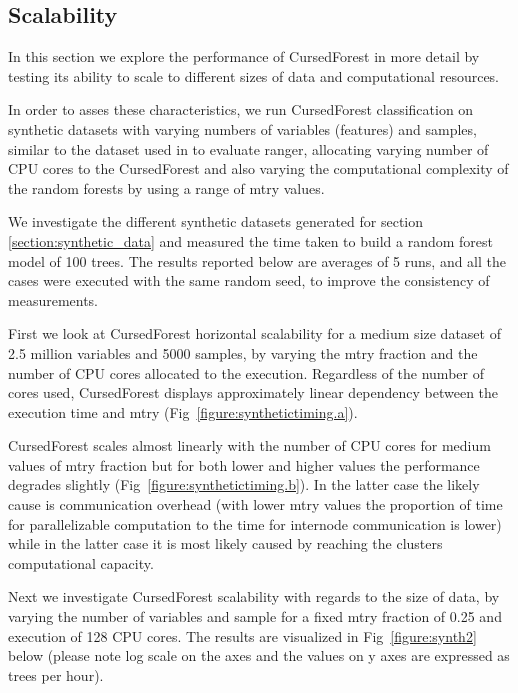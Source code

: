 \documentclass[a4paper]{amsart}
\begin{document}
\subsection{Scalability}
In this section we explore the performance of CursedForest in more detail by testing its ability to scale to different sizes of data
and computational resources.

In order to asses these characteristics, we run CursedForest classification on synthetic datasets with varying numbers
of variables (features) and samples, similar to the dataset used in \cite{Wright.and.Ziegle.2016} to evaluate
ranger, allocating varying number of CPU cores to the CursedForest and also varying the computational complexity
of the random forests by using a range of mtry values.

We investigate the different synthetic datasets generated for section \ref{section:synthetic_data} and measured the time
taken to build a random forest model of 100 trees. The results reported below are averages of 5 runs, and all the cases
were executed with the same random seed, to improve the consistency of measurements.

First we look at CursedForest horizontal scalability for a medium size dataset of 2.5 million variables and 5000
samples, by varying the mtry  fraction and the number of CPU cores allocated to the execution. 
Regardless of the number of cores used, CursedForest displays approximately linear dependency between the execution
time and mtry (Fig~\ref{figure:synthetictiming.a}).

CursedForest scales almost linearly with the number of CPU cores for medium values of mtry fraction but for both lower
and higher values the performance degrades slightly (Fig~\ref{figure:synthetictiming.b}). In the latter case the likely
cause is communication overhead (with lower mtry values the proportion of time for parallelizable computation to the
time for internode communication is lower) while in the latter case it is most likely caused by reaching the clusters
computational capacity.

Next we investigate CursedForest scalability with regards to the size of data, by varying the number of variables and
sample for a fixed mtry fraction of 0.25 and execution of 128 CPU cores. The results are visualized in
Fig~\ref{figure:synth2} below (please note log scale on the axes and the values on y axes are expressed as trees per
hour).
\end{document}
